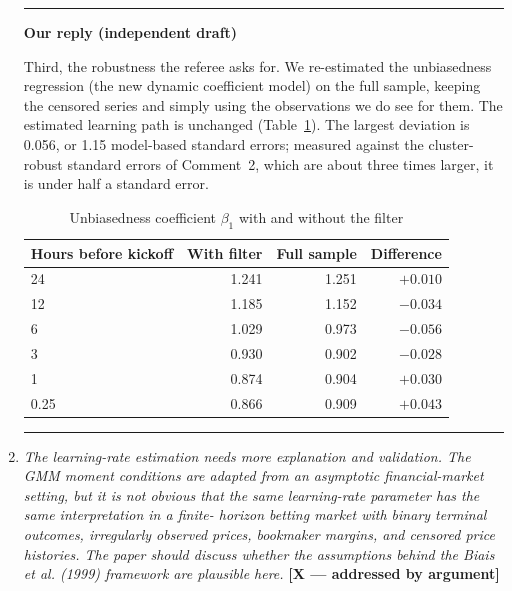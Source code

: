\documentclass[letterpaper,12pt]{article}
\newcounter{b}
\newcommand{\argX}{\textcolor{green!55!black}{\textbf{[X --- addressed by argument]}}}
\newenvironment{ourreply}
  {\par\medskip\noindent\textcolor{ourcol}{\rule{\linewidth}{1pt}}%
   \par\nobreak\vspace{3pt}%
   \noindent\textbf{\textcolor{ourcol}{Our reply (independent draft)}}%
   \par\nobreak\vspace{3pt}}
  {\par\vspace{3pt}%
   \noindent\textcolor{ourcol}{\rule{\linewidth}{0.4pt}}\par\medskip}
\begin{document}
\begin{enumerate}
\begin{ourreply}
Third, the robustness the referee asks for. We re-estimated the unbiasedness regression (the new dynamic coefficient model) on the full sample, keeping the censored series and simply using the observations we do see for them. The estimated learning path is unchanged (Table~\ref{tab:r1c7}). The largest deviation is 0.056, or 1.15 model-based standard errors; measured against the cluster-robust standard errors of Comment~2, which are about three times larger, it is under half a standard error.

\begin{table}[h]
\centering
\caption{Unbiasedness coefficient $\beta_1$ with and without the filter}
\label{tab:r1c7}
\small
\begin{tabular}{lrrr}
\toprule
Hours before kickoff & With filter & Full sample & Difference \\
\midrule
24   & 1.241 & 1.251 & $+0.010$ \\
12   & 1.185 & 1.152 & $-0.034$ \\
6    & 1.029 & 0.973 & $-0.056$ \\
3    & 0.930 & 0.902 & $-0.028$ \\
1    & 0.874 & 0.904 & $+0.030$ \\
0.25 & 0.866 & 0.909 & $+0.043$ \\
\bottomrule
\end{tabular}
\end{table}
\end{ourreply}

\item \textit{The learning-rate estimation needs more explanation and validation. The GMM moment conditions are adapted from an asymptotic financial-market setting, but it is not
obvious that the same learning-rate parameter has the same interpretation in a finite-
horizon betting market with binary terminal outcomes, irregularly observed prices,
bookmaker margins, and censored price histories. The paper should discuss whether
the assumptions behind the Biais et al. (1999) framework are plausible here. } \argX


\end{enumerate}
\end{document}
